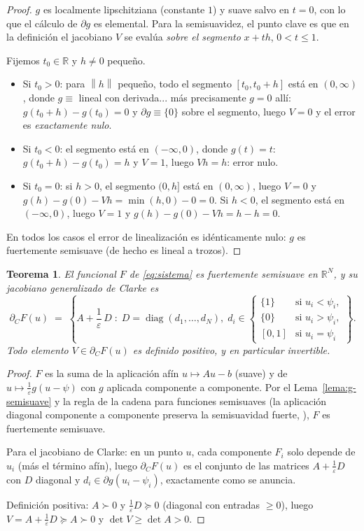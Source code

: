 \documentclass[11pt,a4paper]{article}
\newtheorem{teorema}{Teorema}[section]
\theoremstyle{definition}
\theoremstyle{remark}
\newcommand{\R}{\mathbb{R}}
\newcommand{\Norm}[1]{\left\lVert #1 \right\rVert}
\begin{document}
\begin{proof}
$g$ es localmente lipschitziana (constante $1$) y suave salvo en $t=0$,
con lo que el cálculo de $\partial g$ es elemental. Para la semisuavidez,
el punto clave es que en la definición el jacobiano $V$ se evalúa
\emph{sobre el segmento} $x + th$, $0 < t \le 1$.

Fijemos $t_0 \in \R$ y $h \neq 0$ pequeño.
\begin{itemize}
\item Si $t_0 > 0$: para $\Norm{h}$ pequeño, todo el segmento
$[t_0, t_0 + h]$ está en $(0, \infty)$, donde $g \equiv$ lineal con
derivada... más precisamente $g = 0$ allí: $g(t_0 + h) - g(t_0) = 0$ y
$\partial g \equiv \{0\}$ sobre el segmento, luego $V = 0$ y el error es
\emph{exactamente nulo}.
\item Si $t_0 < 0$: el segmento está en $(-\infty, 0)$, donde $g(t) = t$:
$g(t_0 + h) - g(t_0) = h$ y $V = 1$, luego $Vh = h$: error nulo.
\item Si $t_0 = 0$: si $h > 0$, el segmento $(0, h]$ está en
$(0,\infty)$, luego $V = 0$ y $g(h) - g(0) - Vh = \min(h,0) - 0 = 0$.
Si $h < 0$, el segmento está en $(-\infty, 0)$, luego $V = 1$ y
$g(h) - g(0) - Vh = h - h = 0$.
\end{itemize}
En todos los casos el error de linealización es idénticamente nulo: $g$
es fuertemente semisuave (de hecho es lineal a trozos).
\end{proof}

\begin{teorema}\label{thm:F-semisuave}
El funcional $F$ de \eqref{eq:sistema} es fuertemente semisuave en
$\R^N$, y su jacobiano generalizado de Clarke es
\[
\partial_C F(u) \;=\; \left\{
A + \frac{1}{\varepsilon}\,D
\;:\;
D = \operatorname{diag}(d_1, \dots, d_N),\;
d_i \in
\begin{cases}
\{1\} & \text{si } u_i < \psi_i,\\
\{0\} & \text{si } u_i > \psi_i,\\
[0,1] & \text{si } u_i = \psi_i
\end{cases}
\right\}.
\]
Todo elemento $V \in \partial_C F(u)$ es definido positivo, y en
particular invertible.
\end{teorema}

\begin{proof}
$F$ es la suma de la aplicación afín $u \mapsto Au - b$ (suave) y de
$u \mapsto \frac{1}{\varepsilon} g(u - \psi)$ con $g$ aplicada
componente a componente. Por el Lema~\ref{lema:g-semisuave} y la regla de
la cadena para funciones semisuaves (la aplicación diagonal
componente a componente preserva la semisuavidad fuerte,
\cite{FacchineiPang}), $F$ es fuertemente semisuave.

Para el jacobiano de Clarke: en un punto $u$, cada componente
$F_i$ solo depende de $u_i$ (más el término afín), luego $\partial_C F(u)$
es el conjunto de las matrices $A + \frac{1}{\varepsilon}D$ con $D$
diagonal y $d_i \in \partial g(u_i - \psi_i)$, exactamente como se
anuncia.

Definición positiva: $A \succ 0$ y $\frac{1}{\varepsilon}D \succeq 0$
(diagonal con entradas $\ge 0$), luego
$V = A + \frac{1}{\varepsilon}D \succeq A \succ 0$ y $\det V \ge \det A > 0$.
\end{proof}
\end{document}
